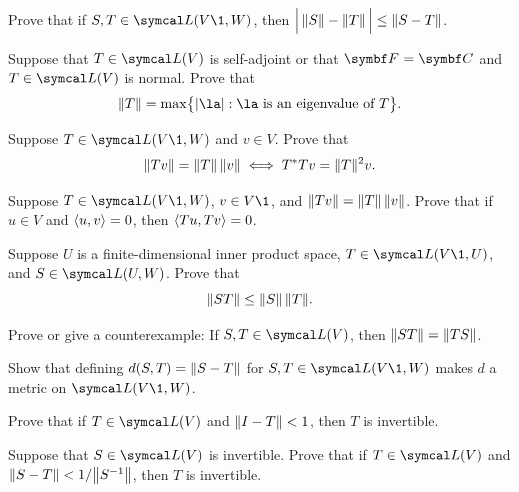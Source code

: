 \begin{exercises}

\exercise
Prove that if $S, T \in \L(V\1, W)$, then $\abs[\Big]{\, \norm{S} - \norm{T} \,} \le \norm{S-T}$. \label{5reverse}


\exercise
Suppose that $T \in \L(V)$ is self-adjoint or that $\F{}= \C{}$ and $T \in \L(V)$ is normal. Prove that
\[
\norm{T} = \max \br[\big]{ \abs{\la} : \la \text{ is an eigenvalue of } T}.
\]
\exercisedisplayend


\exercise
Suppose $T \in \L(V\1, W)$ and $v \in V$. Prove that\label{7eq}
\[
\norm{Tv} = \norm{T} \, \norm{v} \iff T^*T v = \norm{T}^2 v.
\]
\exercisedisplayend


\exercise
Suppose $T \in \L(V\1, W)$, $v \in V\1$, and $\norm{Tv} = \norm{T} \, \norm{v}$. Prove that if $u \in V$ and $\ip{u, v} = 0$, then
$\ip{Tu, Tv} = 0$.


\exercise
Suppose $U$ is a finite-dimensional inner product space, $T \in \L(V\1, U)$, and $S \in \L(U, W)$. Prove that \label{2prod}
\[
\norm{ST} \le \norm{S} \, \norm{T}.
\]
\exercisedisplayend


\exercise
Prove or give a counterexample: If $S, T \in \L(V)$, then $\norm{ST} = \norm{TS}$.


\exercise
Show that defining $d(S, T) = \norm{S-T}$ for $S, T \in \L(V\1, W)$ makes $d$ a metric on $\L(V\1, W)$.\label{7met}


\exercise
\begin{SUBtheorem}
\item
Prove that if $T \in \L(V)$ and $\norm{I - T} < 1$, then $T$ is invertible.
\item
Suppose that $S \in \L(V)$ is invertible. Prove that if $T \in \L(V)$ and $\norm{S - T} < 1/\norm[\big]{S^{-1}}$, then $T$ is invertible.
\end{SUBtheorem}

\end{exercises}
